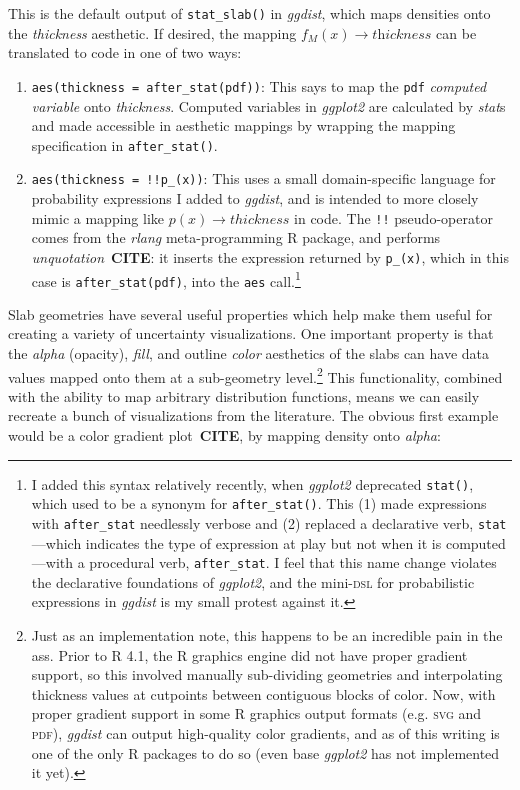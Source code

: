 \documentclass[journal]{vgtc}                     %
\begin{document}
This is the default output of \texttt{stat\_slab()} in \textit{ggdist}, which maps densities onto the \textit{thickness} aesthetic. If desired, the mapping $f_M(x) \rightarrow \textit{thickness}$ can be translated to code in one of two ways:

\begin{enumerate}
    \item \texttt{aes(thickness = after\_stat(pdf))}: This says to map the \texttt{pdf} \textit{computed variable} onto \textit{thickness}. Computed variables in \textit{ggplot2} are calculated by \textit{stat}s and made accessible in aesthetic mappings by wrapping the mapping specification in \texttt{after\_stat()}.
    \item \texttt{aes(thickness = !!p\_(x))}:  This uses a small domain-specific language for probability expressions I added to \textit{ggdist}, and is intended to more closely mimic a mapping like $p(x) \rightarrow thickness$ in code. The \texttt{!!} pseudo-operator comes from the \textit{rlang} meta-programming R package, and performs \textit{unquotation}~\textbf{CITE}: it inserts the expression returned by \texttt{p\_(x)}, which in this case is \texttt{after\_stat(pdf)}, into the \texttt{aes} call.\footnote{I added this syntax relatively recently, when \textit{ggplot2} deprecated \texttt{stat()}, which used to be a synonym for \texttt{after\_stat()}. This (1) made expressions with \texttt{after\_stat} needlessly verbose and (2) replaced a declarative verb, \texttt{stat}---which indicates the type of expression at play but not when it is computed---with a procedural verb, \texttt{after\_stat}. I feel that this name change violates the declarative foundations of \textit{ggplot2}, and the mini-\textsc{dsl} for probabilistic expressions in \textit{ggdist} is my small protest against it.}
\end{enumerate}

Slab geometries have several useful properties which help make them useful for creating a variety of uncertainty visualizations. One important property is that the \textit{alpha} (opacity), \textit{fill}, and outline \textit{color} aesthetics of the slabs can have data values mapped onto them at a sub-geometry level.\footnote{Just as an implementation note, this happens to be an incredible pain in the ass. Prior to R 4.1, the R graphics engine did not have proper gradient support, so this involved manually sub-dividing geometries and interpolating thickness values at cutpoints between contiguous blocks of color. Now, with proper gradient support in some R graphics output formats (e.g. \textsc{svg} and \textsc{pdf}), \textit{ggdist} can output high-quality color gradients, and as of this writing is one of the only R packages to do so (even base \textit{ggplot2} has not implemented it yet).} This functionality, combined with the ability to map arbitrary distribution functions, means we can easily recreate a bunch of visualizations from the literature. The obvious first example would be a color gradient plot~\textbf{CITE}, by mapping density onto \textit{alpha}:
\end{document}
